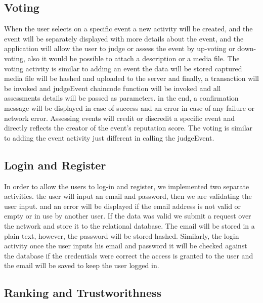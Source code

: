 \subsection{Voting}
When the user selects on a specific event a new activity will be created, and the event will be separately displayed with more details about the event, and the application will allow the user to judge or assess the event by up-voting or down-voting, also it would be possible to attach a description or a media file.
The voting activity is similar to adding an event the data will be stored captured media file will be hashed and uploaded to the server and finally, a transaction will be invoked and judgeEvent chaincode function will be invoked and all assessments details will be passed as parameters. in the end, a confirmation message will be displayed in case of success and an error in case of any failure or network error. 
Assessing events will credit or discredit a specific event and directly reflects the creator of the event's reputation score. 
The voting is similar to adding the event activity just different in calling the judgeEvent. 


\subsection{Login and Register}
In order to allow the users to log-in and register, we implemented two separate activities. the user will input an email and password, then we are validating the user input. and an error will be displayed if the email address is not valid or empty or in use by another user. 
If the data was valid we submit a request over the network and store it to the relational database. The email will be stored in a plain text, however, the password will be stored hashed. 
Similarly, the login activity once the user inputs his email and password it will be checked against the database if the credentials were correct the access is granted to the user and the email will be saved to keep the user logged in.

\cleardoublepage

\subsection{Ranking and Trustworithness} 

